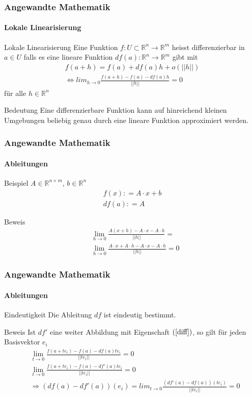 \documentclass{beamer}
\begin{document}
 \begin{frame}
    \frametitle{Angewandte Mathematik}
\framesubtitle{Lokale Linearisierung}
    \begin{block}{Lokale Linearisierung}
Eine Funktion  $f: U \subset \mathbb{R}^n \to \mathbb{R}^m$ heisst differenzierbar  in $a \in U$ falls es eine lineare Funktion 
$df(a):  \mathbb{R}^n \to  \mathbb{R}^m$ gibt mit
\begin{align}
\label{diff}
f(a + h)  =  f(a)  +  df(a) h + o(||h||)  \\
\Leftrightarrow lim_{h \to 0} \frac{f(a + h)  -  f(a)  -  df(a)h}{||h||} = 0
\end{align}
für alle $h \in \mathbb{R}^n$
\end{block}
    \begin{block}{Bedeutung}
Eine differenzierbare Funktion kann  auf hinreichend kleinen Umgebungen 
beliebig genau durch eine lineare Funktion approximiert werden. 
\end{block}
 \end{frame}


 \begin{frame}
    \frametitle{Angewandte Mathematik}
    \framesubtitle{Ableitungen}
    \begin{block}{Beispiel}
$A \in \mathbb{R}^{n \times m}$, $b \in \mathbb{R}^n$ 
\begin{align}
f(x) : = A\cdot x + b \\
df(a) : = A 
\end{align}
\end{block}
    \begin{block}{Beweis}
\begin{align}
& \lim_{h\to 0} \frac{A(x + h) - A\cdot x -A\cdot h}{||h||} = \\
& \lim_{h\to 0} \frac{A\cdot x + A \cdot h - A\cdot x -A\cdot h}{||h||} = 0
\end{align}
\end{block}

 \end{frame}



    \begin{frame}
        \frametitle{Angewandte Mathematik}
        \framesubtitle{Ableitungen}
        \begin{block}{Eindeutigkeit}
    Die Ableitung  $df$ ist eindeutig bestimmt.
    \end{block}
        \begin{block}{Beweis}
    Ist $df'$ eine weiter Abbildung mit Eigenschaft $(\ref{diff})$, so gilt für jeden Basisvektor $e_i$
    \begin{align}
    & \lim_{t \to 0} \frac{f(a+te_i) - f(a) - df(a)t e_i }{||t e_i||} = 0 \\
     & \lim_{t \to 0} \frac{f(a+te_i) - f(a) - df'(a)t e_i }{||t e_i||}  = 0\\
    & \Rightarrow (df(a) - df'(a))(e_i) = lim_{t \to 0}\frac{(df'(a) - df(a))(t e_i)}{||te_i||} = 0
    \end{align}
    \end{block}
     \end{frame}
    
\end{document}
